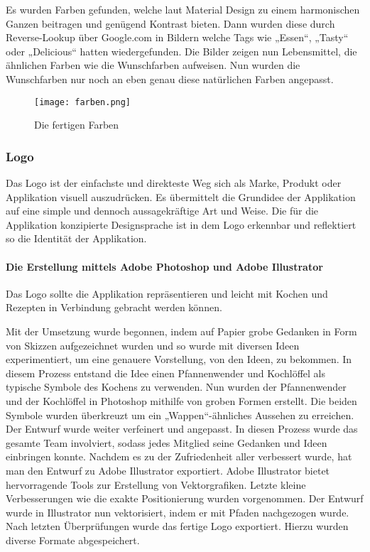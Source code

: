 Es wurden Farben gefunden, welche laut Material Design zu einem harmonischen Ganzen beitragen und genügend Kontrast bieten. Dann wurden diese durch Reverse-Lookup über Google.com in Bildern welche Tags wie „Essen“, „Tasty“ oder „Delicious“ hatten wiedergefunden. Die Bilder zeigen nun Lebensmittel, die ähnlichen Farben wie die Wunschfarben aufweisen. Nun wurden die Wunschfarben nur noch an eben genau diese natürlichen Farben angepasst.

\begin{figure}[H] \centering \texttt{[image: farben.png]} \caption{Die fertigen Farben} \end{figure}

\subsubsection{Logo}

Das Logo\cite{Logo} ist der einfachste und direkteste Weg sich als Marke, Produkt oder Applikation visuell auszudrücken. Es übermittelt die Grundidee der Applikation auf eine simple und dennoch aussagekräftige Art und Weise. Die für die Applikation konzipierte Designsprache ist in dem Logo erkennbar und reflektiert so die Identität der Applikation.

\paragraph{Die Erstellung mittels Adobe Photoshop und Adobe Illustrator}

Das Logo sollte die Applikation repräsentieren und leicht mit Kochen und Rezepten in Verbindung gebracht werden können.

Mit der Umsetzung wurde begonnen, indem auf Papier grobe Gedanken in Form von Skizzen aufgezeichnet wurden und so wurde mit diversen Ideen experimentiert, um eine genauere Vorstellung, von den Ideen, zu bekommen. In diesem Prozess entstand die Idee einen Pfannenwender und Kochlöffel als typische Symbole des Kochens zu verwenden.
Nun wurden der Pfannenwender und der Kochlöffel in Photoshop mithilfe von groben Formen erstellt. Die beiden Symbole wurden überkreuzt um ein „Wappen“-ähnliches Aussehen zu erreichen. Der Entwurf wurde weiter verfeinert und angepasst. In diesen Prozess wurde das gesamte Team involviert, sodass jedes Mitglied seine Gedanken und Ideen einbringen konnte. Nachdem es zu der Zufriedenheit aller verbessert wurde, hat man den Entwurf zu Adobe Illustrator exportiert.
Adobe Illustrator bietet hervorragende Tools zur Erstellung von Vektorgrafiken. Letzte kleine Verbesserungen wie die exakte Positionierung wurden vorgenommen. Der Entwurf wurde in Illustrator nun vektorisiert, indem er mit Pfaden nachgezogen wurde. Nach letzten Überprüfungen wurde das fertige Logo exportiert. Hierzu wurden diverse Formate abgespeichert.

